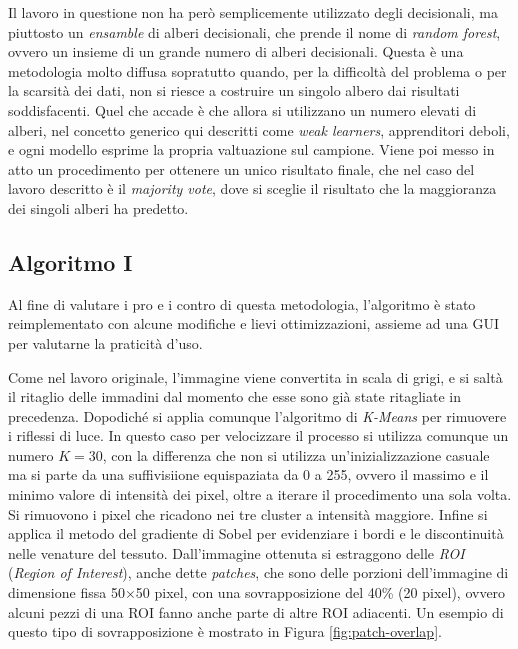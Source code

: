 Il lavoro in questione non ha però semplicemente utilizzato degli decisionali,
ma piuttosto un {\it ensamble} di alberi decisionali, che prende il nome
di {\it random forest}, ovvero un insieme di un grande numero di alberi decisionali.
Questa è una metodologia molto diffusa sopratutto quando, per la difficoltà del
problema o per la scarsità dei dati, non si riesce a costruire un singolo
albero dai risultati soddisfacenti.
Quel che accade è che allora si utilizzano un numero elevati di alberi,
nel concetto generico qui descritti come {\it weak learners}, apprenditori
deboli, e ogni modello esprime la propria valtuazione sul campione.
Viene poi messo in atto un procedimento per ottenere un unico risultato finale,
che nel caso del lavoro descritto è il {\it majority vote}, dove si sceglie
il risultato che la maggioranza dei singoli alberi ha predetto.

\subsection{Algoritmo I}

Al fine di valutare i pro e i contro di questa metodologia, l'algoritmo
è stato reimplementato con alcune modifiche e lievi ottimizzazioni, assieme ad una
GUI per valutarne la praticità d'uso.

Come nel lavoro originale, l'immagine viene convertita in scala di grigi,
e si saltà il ritaglio delle immadini dal momento che esse sono già state
ritagliate in precedenza.
Dopodiché si applia comunque l'algoritmo di {\it K-Means} per rimuovere
i riflessi di luce.
In questo caso per velocizzare il processo si utilizza comunque un numero
$K=30$, con la differenza che non si utilizza un'inizializzazione
casuale ma si parte da una suffivisiione equispaziata da 0 a 255, ovvero
il massimo e il minimo valore di intensità dei pixel, oltre a iterare
il procedimento una sola volta.
Si rimuovono i pixel che ricadono nei tre cluster a intensità maggiore.
Infine si applica il metodo del gradiente di Sobel per evidenziare i bordi
e le discontinuità nelle venature del tessuto.
Dall'immagine ottenuta si estraggono delle {\it ROI} ({\it Region of Interest}),
anche dette {\it patches}, che sono delle porzioni dell'immagine di dimensione
fissa 50$\times$50 pixel, con una sovrapposizione del 40\% (20 pixel), ovvero
alcuni pezzi di una ROI fanno anche parte di altre ROI adiacenti.
Un esempio di questo tipo di sovrapposizione è mostrato in Figura \ref{fig:patch-overlap}.


